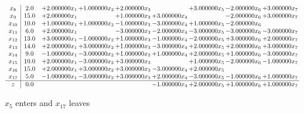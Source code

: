 \documentclass[10pt]{article}
\begin{document}
\[\begin{array}{c| c c@{\hskip 2pt} c@{\hskip 2pt} c@{\hskip 2pt} c@{\hskip 2pt} c@{\hskip 2pt} c@{\hskip 2pt} c@{\hskip 2pt} }
 x_{8}   &  2.0 & + 2.000000 x_{1} & + 1.000000 x_{2} & + 2.000000 x_{3} &   & + 3.000000 x_{5} & -2.000000 x_{6} & + 3.000000 x_{7}\\
 x_{9}   &  15.0 & + 2.000000 x_{1} &   & + 1.000000 x_{3} & + 3.000000 x_{4} &   & -2.000000 x_{6} & + 3.000000 x_{7}\\
 x_{10}   &  10.0 & + 1.000000 x_{1} & + 1.000000 x_{2} & -1.000000 x_{3} & -3.000000 x_{4} & + 1.000000 x_{5} & -2.000000 x_{6} &   \\
 x_{11}   &  6.0 & + 2.000000 x_{1} &   & -3.000000 x_{3} & -2.000000 x_{4} & -3.000000 x_{5} & -3.000000 x_{6} & -3.000000 x_{7}\\
 x_{12}   &  13.0 & + 3.000000 x_{1} & -1.000000 x_{2} & + 1.000000 x_{3} & -1.000000 x_{4} & -2.000000 x_{5} & + 3.000000 x_{6} & + 2.000000 x_{7}\\
 x_{13}   &  14.0 & + 2.000000 x_{1} & + 3.000000 x_{2} & + 1.000000 x_{3} & -3.000000 x_{4} & + 2.000000 x_{5} & + 2.000000 x_{6} & + 3.000000 x_{7}\\
 x_{14}   &  9.0 & -1.000000 x_{1} & -3.000000 x_{2} & + 1.000000 x_{3} & + 1.000000 x_{4} & + 2.000000 x_{5} & + 1.000000 x_{6} & -3.000000 x_{7}\\
 x_{15}   &  10.0 & + 2.000000 x_{1} & -3.000000 x_{2} & + 3.000000 x_{3} &   & + 1.000000 x_{5} & -2.000000 x_{6} & -1.000000 x_{7}\\
 x_{16}   &  15.0 & + 2.000000 x_{1} & + 3.000000 x_{2} & + 3.000000 x_{3} & -3.000000 x_{4} & + 2.000000 x_{5} &    &   \\
 x_{17}   &  5.0 & -1.000000 x_{1} & -3.000000 x_{2} & + 3.000000 x_{3} & + 2.000000 x_{4} & -3.000000 x_{5} & -1.000000 x_{6} & + 1.000000 x_{7}\\
\hline
z    &  0.0  &    &    &   & -1.000000 x_{4} & + 2.000000 x_{5} & + 1.000000 x_{6} & + 1.000000 x_{7}\\
\end{array}\]


 $ x_{5} $ enters and $ x_{17} $ leaves 
\end{document}
